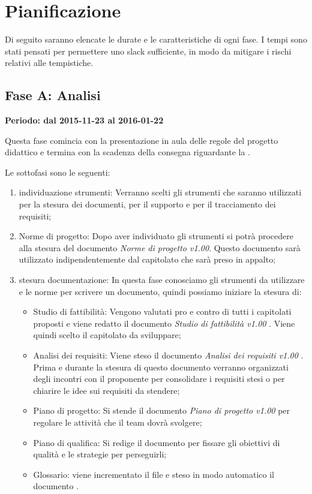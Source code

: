 \documentclass[../PianoProgetto.tex]{subfiles}
\begin{document}
\section{Pianificazione}

	Di seguito saranno elencate le durate e le caratteristiche di ogni fase. I tempi sono stati pensati per permettere uno slack sufficiente, in modo da mitigare i rischi relativi alle tempistiche.
	
	\subsection{Fase A: Analisi}
	
	\textbf{Periodo: dal 2015-11-23 al 2016-01-22}

	Questa fase comincia con la presentazione in aula delle regole del progetto didattico e termina con la scadenza della consegna riguardante la \revisionedeirequisiti .

	Le sottofasi sono le seguenti:
	\begin{enumerate}
		\item individuazione strumenti: Verranno scelti gli strumenti che saranno utilizzati per la stesura dei documenti, per il supporto e per il tracciamento dei requisiti;
		\item Norme di progetto: Dopo aver individuato gli strumenti si potrà procedere alla stesura del documento \textit{Norme di progetto v1.00}. Questo documento sarà utilizzato indipendentemente dal capitolato che sarà preso in appalto;
		\item stesura documentazione: In questa fase conosciamo gli strumenti da utilizzare e le norme per scrivere un documento, quindi possiamo iniziare la stesura di:
		\begin{itemize}
		\item Studio di fattibilità: Vengono valutati pro e contro di tutti i capitolati proposti e viene redatto il documento \textit{Studio di fattibilità v1.00} . Viene quindi scelto il capitolato da sviluppare;
		\item Analisi dei requisiti: Viene steso il documento \textit{Analisi dei requisiti v1.00} . Prima e durante la stesura di questo documento verranno organizzati degli incontri con il proponente per consolidare i requisiti stesi o per chiarire le idee sui requisiti da stendere;
		\item Piano di progetto: Si stende il documento \textit{Piano di progetto v1.00} per regolare le attività che il team dovrà svolgere;
		\item Piano di qualifica: Si redige il documento \pianodiqualificav per fissare gli obiettivi di qualità e le strategie per perseguirli;
		\item Glossario: viene incrementato il file \glossario e steso in modo automatico il documento \glossariov.
		\end{itemize}
	\end{enumerate}
		
\end{document}
